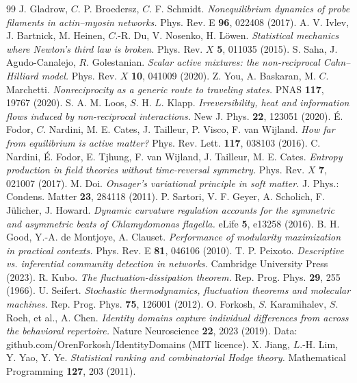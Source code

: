 \documentclass[aps,pre,preprint,superscriptaddress,nofootinbib,longbibliography]{revtex4-2}
\begin{document}
\begin{thebibliography}{99}
 J. Gladrow, $C$. P. Broedersz, $C$. F. Schmidt. \emph{Nonequilibrium dynamics of probe filaments in actin--myosin networks.} Phys. Rev. E \textbf{96}, 022408 (2017).
 A. V. Ivlev, J. Bartnick, M. Heinen, $C$.-R. Du, V. Nosenko, H. L\"owen. \emph{Statistical mechanics where Newton's third law is broken.} Phys. Rev. $X$ \textbf{5}, 011035 (2015).
 S. Saha, J. Agudo-Canalejo, $R$. Golestanian. \emph{Scalar active mixtures: the non-reciprocal Cahn--Hilliard model.} Phys. Rev. $X$ \textbf{10}, 041009 (2020).
 Z. You, A. Baskaran, M. $C$. Marchetti. \emph{Nonreciprocity as a generic route to traveling states.} PNAS \textbf{117}, 19767 (2020).
 S. A. M. Loos, $S$. H. $L$. Klapp. \emph{Irreversibility, heat and information flows induced by non-reciprocal interactions.} New J. Phys. \textbf{22}, 123051 (2020).
 \'E. Fodor, $C$. Nardini, M. E. Cates, J. Tailleur, P. Visco, F. van Wijland. \emph{How far from equilibrium is active matter?} Phys. Rev. Lett. \textbf{117}, 038103 (2016).
 C. Nardini, \'E. Fodor, E. Tjhung, F. van Wijland, J. Tailleur, M. E. Cates. \emph{Entropy production in field theories without time-reversal symmetry.} Phys. Rev. $X$ \textbf{7}, 021007 (2017).
 M. Doi. \emph{Onsager's variational principle in soft matter.} J. Phys.: Condens. Matter \textbf{23}, 284118 (2011).
 P. Sartori, V. F. Geyer, A. Scholich, F. J\"ulicher, J. Howard. \emph{Dynamic curvature regulation accounts for the symmetric and asymmetric beats of Chlamydomonas flagella.} eLife \textbf{5}, e13258 (2016).
 B. H. Good, Y.-A. de Montjoye, A. Clauset. \emph{Performance of modularity maximization in practical contexts.} Phys. Rev. E \textbf{81}, 046106 (2010).
 T. P. Peixoto. \emph{Descriptive vs. inferential community detection in networks.} Cambridge University Press (2023).
 R. Kubo. \emph{The fluctuation-dissipation theorem.} Rep. Prog. Phys. \textbf{29}, 255 (1966).
 U. Seifert. \emph{Stochastic thermodynamics, fluctuation theorems and molecular machines.} Rep. Prog. Phys. \textbf{75}, 126001 (2012).
 O. Forkosh, $S$. Karamihalev, $S$. Roeh, et al., A. Chen. \emph{Identity domains capture individual differences from across the behavioral repertoire.} Nature Neuroscience \textbf{22}, 2023 (2019). Data: github.com/OrenForkosh/IdentityDomains (MIT licence).
 X. Jiang, $L$.-H. Lim, Y. Yao, Y. Ye. \emph{Statistical ranking and combinatorial Hodge theory.} Mathematical Programming \textbf{127}, 203 (2011).

\end{thebibliography}
\end{document}
